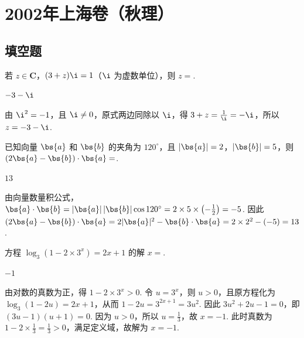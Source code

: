 \chapter{2002年上海卷（秋理）}
\section{填空题}
\begin{problem}
若 \(z \in \mathbf{C}\)，\((3 + z)\i = 1\)（\(\i\) 为虚数单位），则 \(z =\)\fillinblank{}.

\begin{answer}
\(-3-\i\)
\end{answer}

\begin{solution}
由 \(\i^2=-1\)，且 \(\i\ne0\)，原式两边同除以 \(\i\)，得 \(3+z=\frac{1}{\i}=-\i\)，所以 \(z=-3-\i\).
\end{solution}
\end{problem}

\begin{problem}
已知向量 \(\bs{a}\) 和 \(\bs{b}\) 的夹角为 \(120^\circ\)，且 \(|\bs{a}| = 2\)，\(|\bs{b}| = 5\)，则 \((2\bs{a} - \bs{b}) \cdot \bs{a} =\)\fillinblank{}.

\begin{answer}
\(13\)
\end{answer}

\begin{solution}
由向量数量积公式，\(\bs{a}\cdot\bs{b}=|\bs{a}|\,|\bs{b}|\cos120^\circ=2\times5\times\left(-\frac12\right)=-5\). 因此 \((2\bs{a}-\bs{b})\cdot\bs{a}=2|\bs{a}|^2-\bs{b}\cdot\bs{a}=2\times2^2-(-5)=13\).
\end{solution}
\end{problem}

\begin{problem}
方程 \(\log_{3}(1 - 2\times 3^{x}) = 2x + 1\) 的解 \(x =\)\fillinblank{}.

\begin{answer}
\(-1\)
\end{answer}

\begin{solution}
由对数的真数为正，得 \(1-2\times3^x>0\). 令 \(u=3^x\)，则 \(u>0\)，且原方程化为 \(\log_3(1-2u)=2x+1\)，从而 \(1-2u=3^{2x+1}=3u^2\). 因此 \(3u^2+2u-1=0\)，即 \((3u-1)(u+1)=0\). 因为 \(u>0\)，所以 \(u=\frac13\)，故 \(x=-1\). 此时真数为 \(1-2\times\frac13=\frac13>0\)，满足定义域，故解为 \(x=-1\).
\end{solution}
\end{problem}

